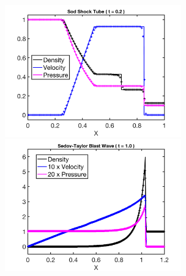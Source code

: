 \documentclass[letterpaper]{jpconf}
\begin{document}
\begin{figure}[h]
  \centering
  \begin{minipage}{18pc}
    \includegraphics[width=18pc]{./Figures/Sod_Astronum_2018}
  \end{minipage}\hspace{0.5pc}%
  \begin{minipage}{18pc}
    \includegraphics[width=18pc]{./Figures/Sedov_Astronum_2018}
  \end{minipage} \\
  \begin{minipage}{18pc}

\end{minipage}
\end{figure}
\end{document}
